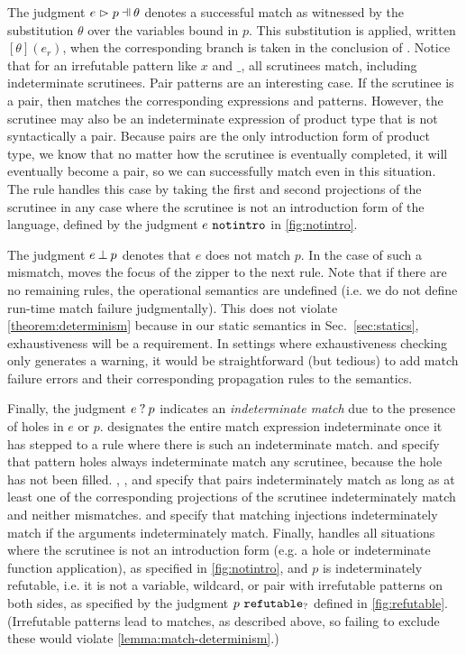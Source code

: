 The judgment $\hpatmatch{e}{p}{\theta}$ denotes a successful match as witnessed by the substitution $\theta$ over the variables bound in $p$. This substitution is applied, written $[\theta](e_r)$, when the corresponding branch is taken in the conclusion of \ITSuccMatch. Notice that for an irrefutable pattern like $x$ and $\_$, all scrutinees match, including indeterminate scrutinees. 
Pair patterns are an interesting case. If the scrutinee is a pair, then \MPair matches the corresponding expressions and patterns. However, the scrutinee may also be an indeterminate expression of product type that is not syntactically a pair. Because pairs are the only introduction form of product type, we know that no matter how the scrutinee is eventually completed, it will eventually become a pair, so we can successfully match even in this situation. %
The \MNotIntroPair rule handles this case by taking the first and second projections of the scrutinee in any case where the scrutinee is not an introduction form of the language, defined by the judgment $e ~\mathtt{notintro}$ in \autoref{fig:notintro}.

The judgment $e \mathbin{\bot} p$ denotes that $e$ does not match $p$. In the case of such a mismatch,
\ITMisMatch moves the focus of the zipper to the next rule. Note that if there are no remaining rules, 
the operational semantics are undefined (i.e. we do not define run-time match failure judgmentally). This does not violate \autoref{theorem:determinism} because
in our static semantics in Sec.~\ref{sec:statics}, exhaustiveness will be a requirement. In settings where exhaustiveness checking
only generates a warning, it would be straightforward (but tedious) to add match failure errors and their corresponding propagation rules to the semantics.



Finally, the judgment $e \mathbin{?} p$ indicates an \emph{indeterminate match} due to the presence of holes in $e$ or $p$. \IMatch designates the entire match expression indeterminate once it has stepped to a rule where there is such an indeterminate match. \MMEHole and \MMHole specify that pattern holes always indeterminate match any scrutinee, because the hole has not been filled. \MMPairL, \MMPairR, and \MMPair specify that pairs indeterminately match as long as at least one of the corresponding projections of the scrutinee indeterminately match and neither mismatches. \MMInl and \MMInr specify that matching injections indeterminately match if the arguments indeterminately match. Finally, \MMNotIntro handles all situations where the scrutinee is not an introduction form (e.g. a hole or indeterminate function application), as specified in \autoref{fig:notintro}, and $p$ is indeterminately refutable, i.e. it is not a variable, wildcard, or pair with irrefutable patterns on both sides, as specified by the judgment $p ~\mathtt{refutable}_?$ defined in \autoref{fig:refutable}. (Irrefutable patterns lead to matches, as described above, so failing to exclude these would violate \autoref{lemma:match-determinism}.)

